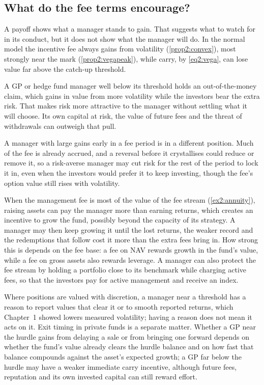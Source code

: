 \begin{chapterrefs}
\FloatBarrier
\section{What do the fee terms encourage?}
\label{sec2:behaviour}

A payoff shows what a manager stands to gain. That suggests what to watch for in its conduct, but it
does not show what the manager will do. In the normal model the incentive fee always gains from
volatility (\cref{prop2:convex}), most strongly near the mark (\cref{prop2:vegapeak}), while carry,
by \cref{eq2:vega}, can lose value far above the catch-up threshold.

A GP or hedge fund manager well below its threshold holds an out-of-the-money claim, which gains
in value from more volatility while the investors bear the extra risk. That makes risk more
attractive to the manager without settling what it will choose. Its own capital at risk, the value of
future fees and the threat of withdrawals can outweigh that pull.

A manager with large gains early in a fee period is in a different position. Much of the fee is
already accrued, and a reversal before it crystallises could reduce or remove it, so a risk-averse
manager may cut risk for the rest of the period to lock it in, even when the investors would prefer
it to keep investing, though the fee's option value still rises with volatility.

When the management fee is most of the value of the fee stream (\cref{ex2:annuity}), raising assets
can pay the manager more than earning returns, which creates an incentive to grow the fund, possibly
beyond the capacity of its strategy. A manager may then keep growing it until the lost returns, the weaker record and the redemptions
that follow cost it more than the extra fees bring in. How strong this is depends on the fee base: a fee on NAV rewards growth in the fund's value,
while a fee on gross assets also rewards leverage. A manager can also protect the fee stream by
holding a portfolio close to its benchmark while charging active fees, so that the investors pay for
active management and receive an index.

Where positions are valued with discretion, a manager near a threshold has a reason to report values
that clear it or to smooth reported returns, which Chapter~1 showed lowers measured volatility; having
a reason does not mean it acts on it. Exit
timing in private funds is a separate matter. Whether a GP near the hurdle gains from delaying a sale
or from bringing one forward depends on whether the fund's value already clears the hurdle balance and on
how fast that balance compounds against the asset's expected growth; a GP far below the hurdle may have a
weaker immediate carry incentive, although future fees, reputation and its own invested capital can still
reward effort.


\end{chapterrefs}
